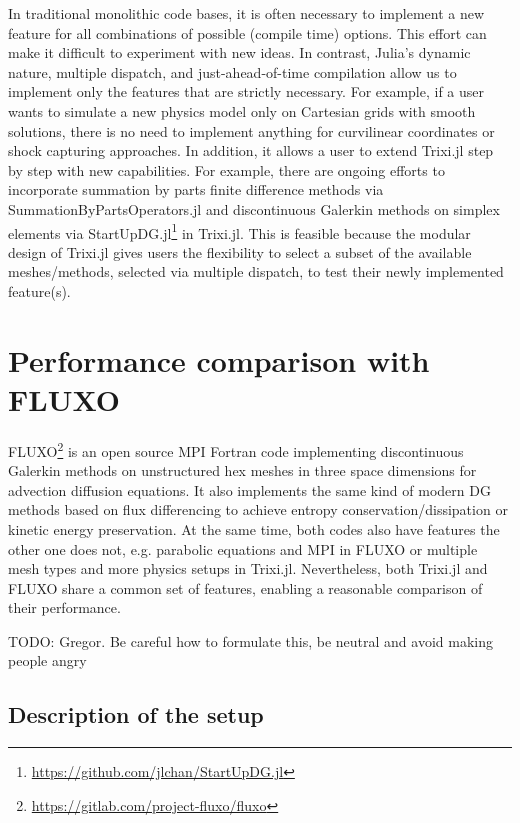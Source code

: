 \documentclass{juliacon}
\makeatletter
\newcommand{\eg}[0]{{e.g.\@}\xspace}
\newcommand{\trixi}{Trixi.jl\xspace}
\newcommand{\todo}[1]{{\color{red}#1}}
\makeatother
\begin{document}
In traditional monolithic code bases, it is often necessary to implement a new
feature for all combinations of possible (compile time) options. This effort
can make it difficult to experiment with new ideas. In contrast, Julia's dynamic
nature, multiple dispatch, and just-ahead-of-time compilation allow us to implement only the features
that are strictly necessary. For example, if a user wants to simulate a new
physics model only on Cartesian grids with smooth solutions, there is no need
to implement anything for curvilinear coordinates or shock capturing approaches.
In addition, it allows a user to extend \trixi step by step with new capabilities.
For example, there are ongoing efforts to incorporate summation by parts finite
difference methods via SummationByPartsOperators.jl \cite{ranocha2021sbp} and
discontinuous Galerkin methods on simplex elements via StartUpDG.jl\footnote{\url{https://github.com/jlchan/StartUpDG.jl}} in \trixi.
This is feasible because the modular design of \trixi gives users the flexibility to select
a subset of the available meshes/methods, selected via multiple dispatch,
to test their newly implemented feature(s).



\section{Performance comparison with FLUXO}
\label{sec:performance-comparison}

FLUXO\footnote{\url{https://gitlab.com/project-fluxo/fluxo}} is an open source
MPI Fortran code implementing discontinuous Galerkin methods on unstructured hex
meshes in three space dimensions for advection diffusion equations. It also
implements the same kind of modern DG methods based on flux differencing
to achieve entropy conservation/dissipation or kinetic energy preservation.
At the same time, both codes also have features the other one does not, \eg
parabolic equations and MPI in FLUXO or multiple mesh types and more physics setups
in \trixi. Nevertheless, both \trixi and FLUXO share a common set of features,
enabling a reasonable comparison of their performance.

\todo{TODO: Gregor. Be careful how to formulate this, be neutral and avoid making people angry} %

\subsection{Description of the setup}
\end{document}
